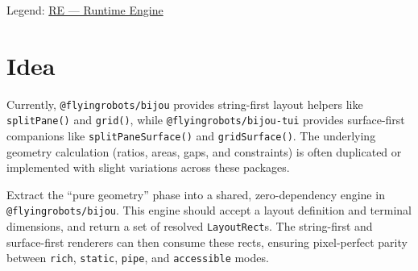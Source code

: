Legend: \href{https://github.com/flyingrobots/bijou/blob/1853ad902f6bf219326409e7f743a5a1d6517dbc/docs/legends/RE-runtime-engine.md}{RE --- Runtime Engine}

\section{Idea}\label{record-377-idea}

Currently, \texttt{@\allowbreak{}f\allowbreak{}l\allowbreak{}y\allowbreak{}i\allowbreak{}n\allowbreak{}g\allowbreak{}r\allowbreak{}o\allowbreak{}b\allowbreak{}o\allowbreak{}t\allowbreak{}s\allowbreak{}/\allowbreak{}b\allowbreak{}i\allowbreak{}j\allowbreak{}o\allowbreak{}u} provides string-first layout helpers like \texttt{s\allowbreak{}p\allowbreak{}l\allowbreak{}i\allowbreak{}t\allowbreak{}P\allowbreak{}a\allowbreak{}n\allowbreak{}e\allowbreak{}(\allowbreak{})} and \texttt{g\allowbreak{}r\allowbreak{}i\allowbreak{}d\allowbreak{}(\allowbreak{})}, while \texttt{@\allowbreak{}f\allowbreak{}l\allowbreak{}y\allowbreak{}i\allowbreak{}n\allowbreak{}g\allowbreak{}r\allowbreak{}o\allowbreak{}b\allowbreak{}o\allowbreak{}t\allowbreak{}s\allowbreak{}/\allowbreak{}b\allowbreak{}i\allowbreak{}j\allowbreak{}o\allowbreak{}u\allowbreak{}-\allowbreak{}t\allowbreak{}u\allowbreak{}i} provides surface-first companions like \texttt{s\allowbreak{}p\allowbreak{}l\allowbreak{}i\allowbreak{}t\allowbreak{}P\allowbreak{}a\allowbreak{}n\allowbreak{}e\allowbreak{}S\allowbreak{}u\allowbreak{}r\allowbreak{}f\allowbreak{}a\allowbreak{}c\allowbreak{}e\allowbreak{}(\allowbreak{})} and \texttt{g\allowbreak{}r\allowbreak{}i\allowbreak{}d\allowbreak{}S\allowbreak{}u\allowbreak{}r\allowbreak{}f\allowbreak{}a\allowbreak{}c\allowbreak{}e\allowbreak{}(\allowbreak{})}. The underlying geometry calculation (ratios, areas, gaps, and constraints) is often duplicated or implemented with slight variations across these packages.

Extract the ``pure geometry'' phase into a shared, zero-dependency engine in \texttt{@\allowbreak{}f\allowbreak{}l\allowbreak{}y\allowbreak{}i\allowbreak{}n\allowbreak{}g\allowbreak{}r\allowbreak{}o\allowbreak{}b\allowbreak{}o\allowbreak{}t\allowbreak{}s\allowbreak{}/\allowbreak{}b\allowbreak{}i\allowbreak{}j\allowbreak{}o\allowbreak{}u}. This engine should accept a layout definition and terminal dimensions, and return a set of resolved \texttt{L\allowbreak{}a\allowbreak{}y\allowbreak{}o\allowbreak{}u\allowbreak{}t\allowbreak{}R\allowbreak{}e\allowbreak{}c\allowbreak{}t}s. The string-first and surface-first renderers can then consume these rects, ensuring pixel-perfect parity between \texttt{r\allowbreak{}i\allowbreak{}c\allowbreak{}h}, \texttt{s\allowbreak{}t\allowbreak{}a\allowbreak{}t\allowbreak{}i\allowbreak{}c}, \texttt{p\allowbreak{}i\allowbreak{}p\allowbreak{}e}, and \texttt{a\allowbreak{}c\allowbreak{}c\allowbreak{}e\allowbreak{}s\allowbreak{}s\allowbreak{}i\allowbreak{}b\allowbreak{}l\allowbreak{}e} modes.

